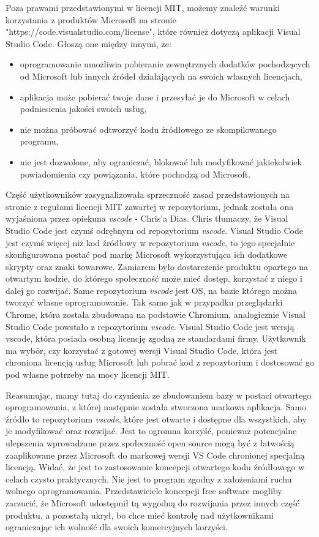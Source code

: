 \documentclass{article}
\begin{document}
Poza prawami przedstawionymi w licencji MIT, możemy znaleźć warunki korzystania z produktów Microsoft na stronie "https://code.visualstudio.com/license"\cite{vscode.microsoft}, które również dotyczą aplikacji Visual Studio Code. Głoszą one między innymi, że:
\begin{itemize}
    \item oprogramowanie umożliwia pobieranie zewnętrznych dodatków pochodzących od Microsoft lub innych źródeł działających na swoich własnych licencjach,
    \item aplikacja może pobierać twoje dane i przesyłać je do Microsoft w celach podniesienia jakości swoich usług,
    \item nie można próbować odtworzyć kodu źródłowego ze skompilowanego programu,
    \item nie jest dozwolone, aby ograniczać, blokować lub modyfikować jakiekolwiek powiadomienia czy powiązania, które pochodzą od Microsoft\cite{vscode.microsoft}.
\end{itemize}

Część użytkowników zasygnalizowała sprzeczność zasad przedstawionych na stronie z regułami licencji MIT zawartej w repozytorium, jednak została ona wyjaśniona przez opiekuna \emph{vscode} - Chris'a Dias. Chris tłumaczy, że Visual Studio Code jest czymś odrębnym od repozytorium \emph{vscode}. Visual Studio Code jest czymś więcej niż kod źródłowy w repozytorium \emph{vscode}, to jego specjalnie skonfigurowana postać pod markę Microsoft wykorzystująca ich dodatkowe skrypty oraz znaki towarowe. Zamiarem było dostarczenie produktu opartego na otwartym kodzie, do którego społeczność może mieć dostęp, korzystać z niego i dalej go rozwijać. Same repozytorium \emph{vscode} jest OS, na bazie którego można tworzyć własne oprogramowanie. Tak samo jak w przypadku przeglądarki Chrome, która została zbudowana na podstawie Chromium, analogicznie Visual Studio Code powstało z repozytorium \emph{vscode}. Visual Studio Code jest wersją vscode, która posiada osobną licencję zgodną ze standardami firmy. Użytkownik ma wybór, czy korzystać z gotowej wersji Visual Studio Code, która jest chroniona licencją usług Microsoft lub pobrać kod z repozytorium i dostosować go pod własne potrzeby na mocy licencji MIT\cite{vscode.issues}.

Reasumując, mamy tutaj do czynienia ze zbudowaniem bazy w postaci otwartego oprogramowania, z której następnie została stworzona markowa aplikacja. Samo źródło to repozytorium \emph{vscode}, które jest otwarte i dostępne dla wszystkich, aby je modyfikować oraz rozwijać. Jest to ogromna korzyść, ponieważ potencjalne ulepszenia wprowadzane przez społeczność open source mogą być z łatwością zaaplikowane przez Microsoft do markowej wersji VS Code chronionej specjalną licencją. Widać, że jest to zastosowanie koncepcji otwartego kodu źródłowego w celach czysto praktycznych. Nie jest to program zgodny z założeniami ruchu wolnego oprogramowania. Przedstawiciele koncepcji free software mogliby zarzucić, że Microsoft udostępnił tą wygodną do rozwijania przez innych część produktu, a pozostałą ukrył, bo chce mieć kontrolę nad użytkownikami ograniczając ich wolność dla swoich komercyjnych korzyści.
\end{document}
